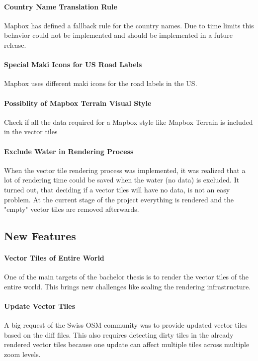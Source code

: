 \paragraph{Country Name Translation Rule}
Mapbox has defined a fallback rule\cite{22_mapbox.com_2015} for the country names. Due to time limits this behavior could not be implemented and should be implemented in a future release.

\paragraph{Special Maki Icons for US Road Labels}
Mapbox uses different maki icons\cite{101_mapbox.com_2015} for the road labels in the US.  

\paragraph{Possiblity of Mapbox Terrain Visual Style}
Check if all the data required for a Mapbox style like Mapbox Terrain\cite{102_mapbox.com_2015} is included in the vector tiles

\paragraph{Exclude Water in Rendering Process}

When the vector tile rendering process was implemented, it was realized that a lot of rendering time could be saved
when the water (no data) is excluded.
It turned out, that deciding if a vector tiles will have no data, is not an easy problem. At the current stage of the project
everything is rendered and the "empty" vector tiles are removed afterwards.

\subsection{New Features}\label{new_features}

\paragraph{Vector Tiles of Entire World}
One of the main targets of the bachelor thesis is to render the vector tiles of the entire world. This brings new challenges like scaling the rendering infrastructure. 

\paragraph{Update Vector Tiles}
A big request of the Swiss OSM community was to provide updated vector tiles based on the diff\cite{5_wiki.openstreetmap.org_2015} files.
This also requires detecting dirty tiles in the already rendered vector tiles because one update can affect multiple tiles across multiple zoom levels.

